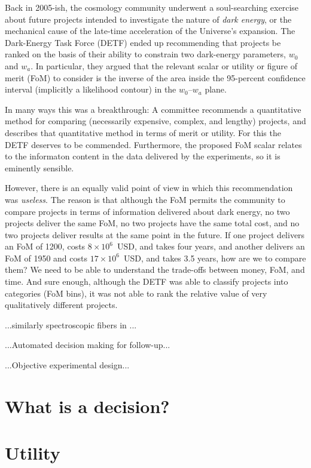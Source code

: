 \documentclass[12pt,twoside,pdftex]{article}
\begin{document}
Back in 2005-ish, the cosmology community underwent a soul-searching
exercise about future projects intended to investigate the nature of
\emph{dark energy}, or the mechanical cause of the late-time
acceleration of the Universe's expansion.  The Dark-Energy Task
Force (DETF) ended up recommending that projects be ranked on the
basis of their ability to constrain two dark-energy parameters, $w_0$
and $w_a$.  In particular, they argued that the relevant scalar or
utility or figure of merit (FoM) to consider is the inverse of the
area inside the 95-percent confidence interval (implicitly a
likelihood contour) in the $w_0$--$w_a$ plane.

In many ways this was a breakthrough: A committee recommends a
quantitative method for comparing (necessarily expensive, complex, and
lengthy) projects, and describes that quantitative method in terms of
merit or utility.  For this the DETF deserves to be commended.
Furthermore, the proposed FoM scalar relates to the informaton content
in the data delivered by the experiments, so it is eminently sensible.

However, there is an equally valid point of view in which this
recommendation was \emph{useless}.  The reason is that although the
FoM permits the community to compare projects in terms of information
delivered about dark energy, no two projects deliver the same FoM, no
two projects have the same total cost, and no two projects deliver
results at the same point in the future.  If one project delivers an
FoM of 1200, costs $8\times 10^6$~USD, and takes four years, and
another delivers an FoM of 1950 and costs $17\times 10^6$~USD, and
takes 3.5 years, how are we to compare them?  We need to be able to
understand the trade-offs between money, FoM, and time.  And sure
enough, although the DETF was able to classify projects into
categories (FoM bins), it was not able to rank the relative value of
very qualitatively different projects.

...similarly spectroscopic fibers in ...

...Automated decision making for follow-up...

...Objective experimental design...

\section{What is a decision?}

\section{Utility}
\end{document}
